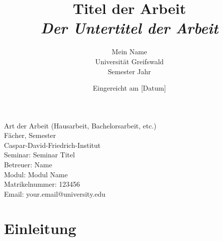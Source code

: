 \documentclass[12pt,a4paper]{article} %
\begin{document}
		
	
\title{\LARGE{Titel der Arbeit} \\ \Large\itshape{Der Untertitel der Arbeit}}
\author{{Mein Name} \\ {Universität Greifswald} \\ {Semester Jahr}}
\date{Eingereicht am [Datum]}
	
\maketitle
\vspace*{\fill}
\begin{flushleft}
	Art der Arbeit (Hausarbeit, Bachelorsarbeit, etc.)\\
	Fächer, Semester \\
	Caspar-David-Friedrich-Institut \\
	Seminar: Seminar Titel \\
	Betreuer: Name \\
	Modul: Modul Name \\
	Matrikelnummer: 123456 \\
	Email: your.email@university.edu
\end{flushleft}
\newpage
	
	
\pagestyle{fancy}
\fancyhf{}
\fancyfoot[R]{\thepage} 
\renewcommand{\headrulewidth}{0pt} 
	
\tableofcontents
\newpage
	
	
\onehalfspacing %
	
	\section{Einleitung}
	
\end{document}
